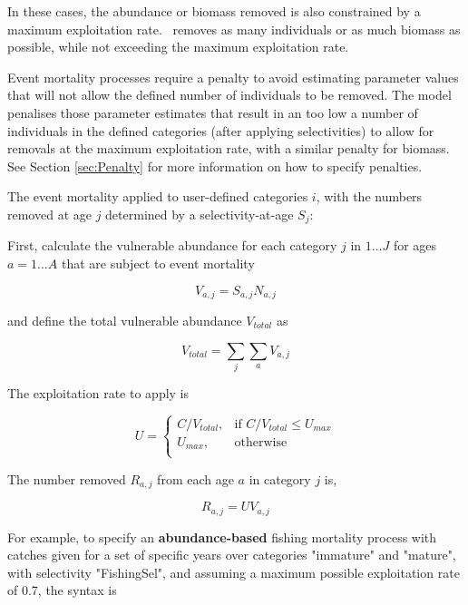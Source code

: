 In these cases, the abundance or biomass removed is also constrained by a maximum exploitation rate. \CNAME\ removes as many individuals or as much biomass as possible,  while not exceeding the maximum exploitation rate.

Event mortality processes require a penalty to avoid estimating parameter values that will not allow the defined number of individuals to be removed. The model penalises those parameter estimates that result in an too low a number of individuals in the defined categories (after applying selectivities) to allow for removals at the maximum exploitation rate, with a similar penalty for biomass. See Section \ref{sec:Penalty} for more information on how to specify penalties.

The event mortality applied to user-defined categories $i$, with the numbers removed at age $j$ determined by a selectivity-at-age $S_j$:

First, calculate the vulnerable abundance for each category $j$ in $1 \ldots J$ for ages $a = 1 \ldots A$ that are subject to event mortality

\begin{equation}
  V_{a,j} = S_{a,j} N_{a,j}
\end{equation}

and define the total vulnerable abundance $V_{total}$ as

\begin{equation}
  V_{total}  = \sum\limits_j {\sum\limits_a {V_{a,j}}}
\end{equation}

The exploitation rate to apply is

\begin{equation}
U = \begin{cases}
  C/V_{total}, & \text{if $C/V_{total} \leq U_{max}$} \\
  U_{max}, & \text{otherwise}\\
  \end{cases}
\end{equation}

The number removed $R_{a,j}$ from each age $a$ in category $j$ is,

\begin{equation}
  R_{a,j} = U V_{a,j}
\end{equation}

For example, to specify an \textbf{abundance-based} fishing mortality process with catches given for a set of specific years over categories "immature" and "mature", with selectivity "FishingSel", and assuming a maximum possible exploitation rate of 0.7, the syntax is

